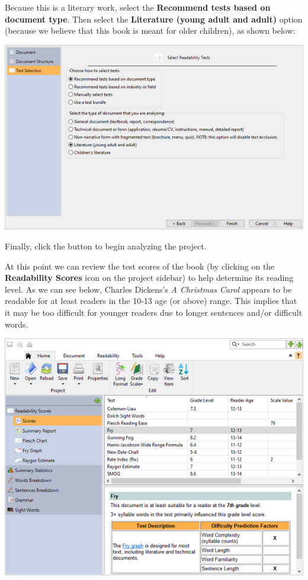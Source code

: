 \documentclass[
]{book}
\theoremstyle{definition}
\theoremstyle{definition}
\theoremstyle{definition}
\theoremstyle{definition}
\theoremstyle{remark}
\begin{document}
Because this is a literary work, select the \textbf{Recommend tests based on document type}. Then select the \textbf{Literature (young adult and adult)} option (because we believe that this book is meant for older children), as shown below:

\includegraphics{Images/wizarddoctypelitselected.png}

Finally, click the  button to begin analyzing the project.

At this point we can review the test scores of the book (by clicking on the \textbf{Readability Scores} icon on the project sidebar) to help determine its reading level. As we can see below, Charles Dickens's \emph{A Christmas Carol} appears to be readable for at least readers in the 10-13 age (or above) range. This implies that it may be too difficult for younger readers due to longer sentences and/or difficult words.

\includegraphics{Images/scores.png}
\end{document}
